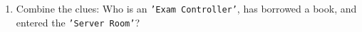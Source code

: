\documentclass[12pt,a4paper]{article}
\begin{document}
\begin{enumerate}

    \item Combine the clues: Who is an \texttt{'Exam Controller'}, has borrowed a book, and entered the \texttt{'Server Room'}?

\end{enumerate}
\end{document}
